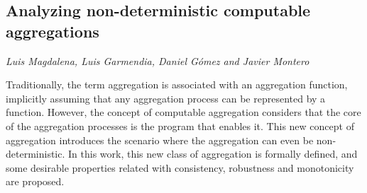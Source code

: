 \documentclass[../booklet.tex]{subfiles}
\begin{document}
\subsection[Analyzing non-deterministic computable aggregations. {\it Luis Magdalena, Luis Garmendia, Daniel Gómez and Javier Montero}]{Analyzing non-deterministic computable aggregations}
   

\begin{center}
  {\it Luis Magdalena, Luis Garmendia, Daniel Gómez and Javier Montero}
\end{center}




Traditionally, the term aggregation is associated with an aggregation function, implicitly assuming that any aggregation process can be represented by a function. However, the concept of computable aggregation considers that the core of the aggregation processes is the program that enables it. This new concept of aggregation introduces the scenario where the aggregation can even be non-deterministic. In this work, this new class of aggregation is formally defined, and some desirable properties related with consistency, robustness and monotonicity are proposed.  

\end{document}
